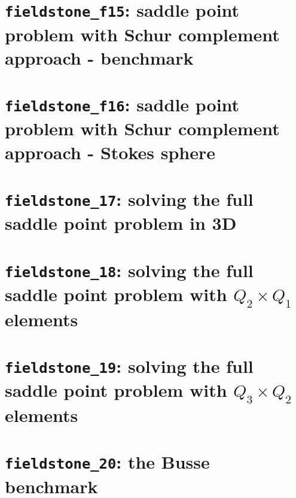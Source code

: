 \documentclass[a4paper]{article}
\begin{document}
\newpage
\section{{\tt fieldstone\_f15}: saddle point problem with Schur complement approach - benchmark \label{f15}}


\newpage
\section{{\tt fieldstone\_f16}: saddle point problem with Schur complement approach - Stokes sphere \label{f16}}


\newpage
\section{{\tt fieldstone\_17}: solving the full saddle point problem in 3D \label{f17}}


\newpage
\section{{\tt fieldstone\_18}: solving the full saddle point problem with $Q_2\times Q_1$ elements \label{f18}}


\newpage
\section{{\tt fieldstone\_19}: solving the full saddle point problem with $Q_3\times Q_2$ elements \label{f19}}


\newpage
\section{{\tt fieldstone\_20}: the Busse benchmark \label{f20}}

\end{document}
